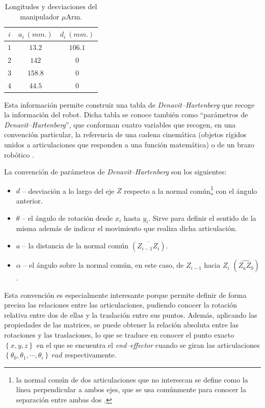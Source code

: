 \begin{table}[ht]
\begin{minipage}{.49\linewidth}
\begin{tabular}{|| c | c c ||}
            $i$ & $a_i~(mm.)$ & $d_i~(mm.)$ \\ [0.5ex]
            \hline\hline
            $1$ & $13.2$      & $106.1$     \\
            \hline
            $2$ & $142$       & $0$         \\
            \hline
            $3$ & $158.8$     & $0$         \\
            \hline
            $4$ & $44.5$      & $0$         \\ [1ex]
            \hline
        \end{tabular}
        \caption{Longitudes y desviaciones del manipulador $\mu$Arm.}
        \label{tab:uArm-ld-values}
    \end{minipage}
\end{table}

Esta información permite construir una tabla de \textit{Denavit--Hartenberg} que
recoge la información del robot. Dicha tabla se conoce también como ``parámetros de
\textit{Denavit--Hartenberg}'', que conforman cuatro variables que recogen, en una
convención particular, la referencia de una cadena cinemática (objetos rígidos unidos
a articulaciones que responden a una función matemática) o de un brazo robótico \cite{DenavitHartenbergParameters2020}.

La convención de parámetros de \textit{Denavit--Hartenberg} son los siguientes:
\begin{itemize}
    \item $d$ -- desviación a lo largo del eje $Z$ respecto a la normal común\footnote{la normal
              común de dos articulaciones que no intersecan se define como la línea perpendicular a
              ambos ejes, que se usa comúnmente para conocer la separación entre ambas dos \cite{CommonNormalRobotics2017}.}
          con el ángulo anterior.
    \item $\theta$ -- el ángulo de rotación desde $x_i$ hasta $y_i$. Sirve para definir
          el sentido de la misma además de indicar el movimiento que realiza dicha articulación.
    \item $a$ -- la distancia de la normal común $\left(\overline{Z_{i - 1}Z_i}\right)$.
    \item $\alpha$ -- el ángulo sobre la normal común, en este caso, de $Z_{i - 1}$ hacia $Z_i$ $\left(\widehat{Z_aZ_b}\right)$.
\end{itemize}

Esta convención es especialmente interesante porque permite definir de forma precisa
las relaciones entre las articulaciones, pudiendo conocer la rotación relativa entre
dos de ellas y la traslación entre sus puntos. Además, aplicando las propiedades
de las matrices, se puede obtener la relación absoluta entre las rotaciones y las
traslaciones, lo que se traduce en conocer el punto exacto $\left\{x, y, z\right\}$ en el que se encuentra el
\textit{end--effector} cuando se giran las articulaciones
$\left\{\theta_0, \theta_1, \cdots, \theta_i\right\}~rad$ respectivamente.

